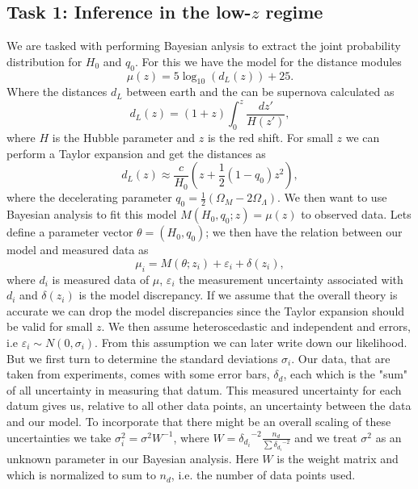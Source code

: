 \documentclass[11pt,a4paper]{article}
\begin{document}
\subsection[Task 1]{Task 1: Inference in the low-$z$ regime}
We are tasked with performing Bayesian anlysis to extract the joint probability distribution for $H_0$ and $q_0$. For this we have the model for the distance modules
\begin{equation*}
    \mu(z) = 5\log_{10}(d_L(z)) + 25.
\end{equation*}
Where the distances $d_L$ between earth and the can be supernova calculated as
\begin{equation}
    \label{eq:dl}
    d_L(z) = (1 + z )\int_0^z \frac{dz'}{H(z')},
\end{equation}
where $H$ is the Hubble parameter and $z$ is the red shift. For small $z$ we can perform a Taylor expansion and get the distances as 
\begin{equation*}
    d_L(z) \approx \frac{c}{H_0} \left(z + \frac{1}{2}(1 - q_0)z^2 \right),
\end{equation*}
where the decelerating parameter $q_0 = \frac{1}{2}(\Omega_M - 2 \Omega_\Lambda)$. We then want to use Bayesian analysis to fit this model $M(H_0,q_0; z) = \mu(z)$ to observed data. Lets define a parameter vector $\theta = (H_0, q_0)$; we then have the relation between our model and measured data as
\begin{equation*}
    \mu_i = M(\theta; z_i) + \varepsilon_i + \delta(z_i),
\end{equation*}
where $d_i$ is measured data of $\mu$, $\varepsilon_i$ the measurement uncertainty associated with $d_i$ and $\delta(z_i)$ is the model discrepancy. If we assume that the overall theory is accurate we can drop the model discrepancies since the Taylor expansion should be valid for small $z$. We then assume heteroscedastic and independent and errors, i.e $\varepsilon_i \sim N(0, \sigma_i)$. From this assumption we can later write down our likelihood. But we first turn to determine the standard deviations $\sigma_i$. Our data, that are taken from experiments, comes with some error bars, $\delta_d$, each which is the "sum" of all uncertainty in  measuring that datum. This measured uncertainty for each datum gives us, relative to all other data points, an uncertainty between the data and our model. To incorporate that there might be an overall scaling of these uncertainties we take $\sigma_i^2 = \sigma^2 W^{-1}$, where $ W = {\delta_{d_i}}^{-2} \frac{n_d}{\sum {{\delta_{d_i}}^{-2}}}$ and we treat $\sigma^2$ as an unknown parameter in our Bayesian analysis. Here $W$ is the weight matrix and which is normalized to sum to $n_d$, i.e. the number of data points used.
\end{document}
